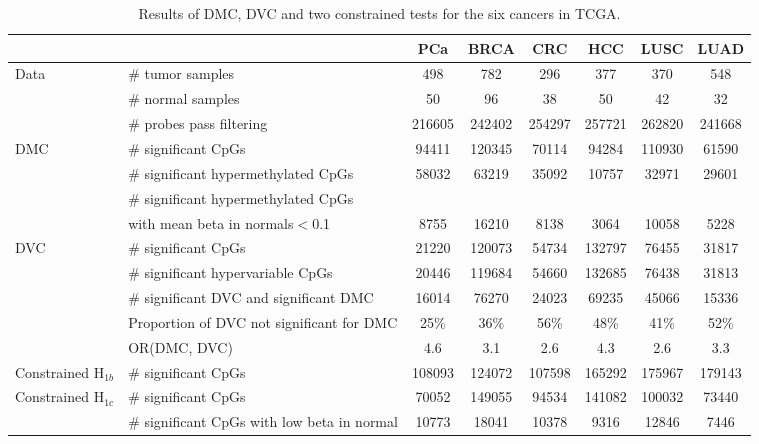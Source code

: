 \documentclass{statsoc}
\begin{document}
\begin{table}
\caption{Results of DMC, DVC and two constrained tests for the six cancers in TCGA.}
\label{all_DMresults}
\centering
      {\begin{tabular}{@{}llcccccc@{}}
        \hline
            &   & PCa & BRCA   & CRC  & HCC & LUSC   &  LUAD \\ \hline
Data    & \# tumor samples & 498& 782 & 296 & 377& 370 & 548 \\
        & \# normal samples & 50&  96 &  38 & 50 & 42 & 32 \\
        & \# probes pass filtering & 216605 &  242402 & 254297 & 257721 & 262820 & 241668\\
DMC     & \# significant CpGs &  94411 & 120345 & 70114 & 94284 & 110930 & 61590 \\
        & \# significant hypermethylated CpGs & 58032 & 63219 & 35092 & 10757 &32971 & 29601 \\
        & \# significant hypermethylated CpGs  & &  & & & & \\
        &  \hspace{10pt} with mean beta in normals$<$0.1 & 8755 & 16210 & 8138 & 3064 & 10058 & 5228\\
DVC     & \# significant CpGs & 21220 & 120073 & 54734 & 132797 & 76455 & 31817\\
        & \# significant hypervariable CpGs & 20446 & 119684 & 54660 & 132685 & 76438 & 31813\\
        & \# significant DVC and significant DMC &  16014 & 76270 & 24023 & 69235 & 45066 & 15336\\
           & Proportion of DVC not significant for DMC &  25\% & 36\% & 56\% & 48\% & 41\% & 52\%\\
        & OR(DMC, DVC) & 4.6 & 3.1 & 2.6 & 4.3 & 2.6 & 3.3 \\
Constrained H$_{1b}$& \# significant CpGs & 108093 & 124072 & 107598  & 165292  & 175967  & 179143 \\
Constrained H$_{1c}$& \# significant CpGs &  70052 & 149055 & 94534 & 141082 & 100032 & 73440 \\
        & \# significant CpGs with low beta in normal& 10773 & 18041 & 10378 & 9316 &12846 &  7446\\
     \hline
      \end{tabular}}
\end{table}
\end{document}
